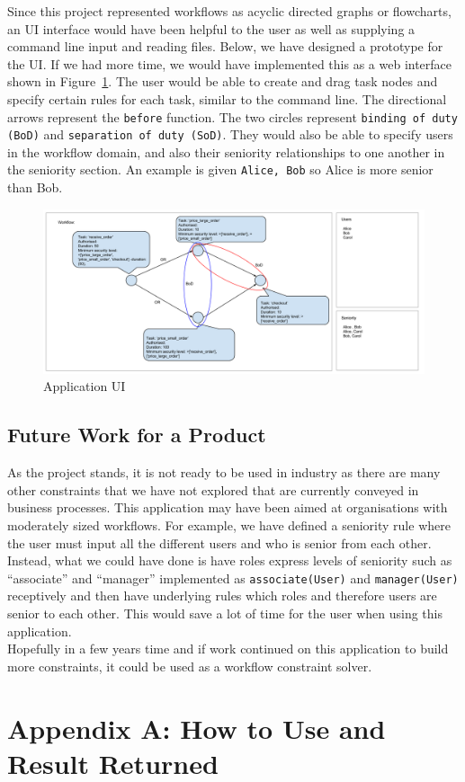 \documentclass[a4paper]{report}
\begin{document}
Since this project represented workflows as acyclic directed graphs or flowcharts, an UI interface would have been helpful to the user as well as supplying a command line input and reading files. Below, we have designed a prototype for the UI. If we had more time, we would have implemented this as a web interface shown in Figure~\ref{fig:Application UI}. The user would be able to create and drag task nodes and specify certain rules for each task, similar to the command line. The directional arrows represent the \texttt{before} function. The two circles represent \texttt{binding of duty (BoD)} and \texttt{separation of duty (SoD)}. They would also be able to specify users in the workflow domain, and also their seniority relationships to one another in the seniority section. An example is given \texttt{Alice, Bob} so Alice is more senior than Bob.

\begin{figure}
\includegraphics[scale=0.35, angle=90,origin=c]{ui.png}
\caption{Application UI}
\label{fig:Application UI}
\end{figure}

\section{Future Work for a Product}
As the project stands, it is not ready to be used in industry as there are many other constraints that we have not explored that are currently conveyed in business processes. This application may have been aimed at organisations with moderately sized workflows. For example, we have defined a seniority rule where the user must input all the different users and who is senior from each other. Instead, what we could have done is have roles express levels of seniority such as ``associate'' and ``manager'' implemented as \texttt{associate(User)} and \texttt{manager(User)} receptively and then have underlying rules which roles and therefore users are senior to each other. This would save a lot of time for the user when using this application.\\

Hopefully in a few years time and if work continued on this application to build more constraints, it could be used as a workflow constraint solver. 

\chapter{Appendix A: How to Use and Result Returned}


\end{document}
